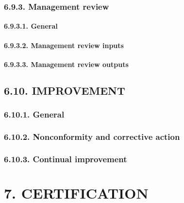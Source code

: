 \documentclass[
]{article}
\begin{document}
\hypertarget{management-review-1}{%
\subsubsection{6.9.3. Management review}\label{management-review-1}}

\hypertarget{general-16}{%
\paragraph{6.9.3.1. General}\label{general-16}}

\hypertarget{management-review-inputs-1}{%
\paragraph{6.9.3.2. Management review
inputs}\label{management-review-inputs-1}}

\hypertarget{management-review-outputs-1}{%
\paragraph{6.9.3.3. Management review
outputs}\label{management-review-outputs-1}}

\hypertarget{improvement-1}{%
\subsection{6.10. IMPROVEMENT}\label{improvement-1}}

\hypertarget{general-17}{%
\subsubsection{6.10.1. General}\label{general-17}}

\hypertarget{nonconformity-and-corrective-action-1}{%
\subsubsection{6.10.2. Nonconformity and corrective
action}\label{nonconformity-and-corrective-action-1}}

\hypertarget{continual-improvement-1}{%
\subsubsection{6.10.3. Continual
improvement}\label{continual-improvement-1}}

\hypertarget{certification-1}{%
\section{7. CERTIFICATION}\label{certification-1}}
\end{document}
